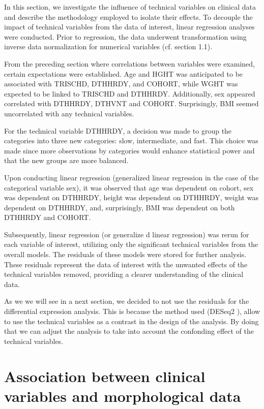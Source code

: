 \documentclass[a4paper, 11pt]{article}
\begin{document}
\begin{multicols}{2}
In this section, we investigate the influence of technical variables on clinical data and describe the methodology employed to isolate their effects.
To decouple the impact of technical variables from the data of interest, linear regression analyses were conducted.
Prior to regression, the data underwent transformation using inverse data normalization for numerical variables (cf. section 1.1).

From the preceding section where correlations between variables were examined, certain expectations were established.
Age and HGHT was anticipated to be associated with TRISCHD, DTHHRDY, and COHORT, while WGHT was expected to be linked to TRISCHD and DTHHRDY.
Additionally, sex appeared correlated with DTHHRDY, DTHVNT and COHORT. Surprisingly, BMI seemed uncorrelated with any technical variables.

For the technical variable DTHHRDY, a decision was made to group the categories into three new categories: slow, intermediate, and fast.
This choice was made since more observations by categories would enhance statistical power and that the new groups are more balanced.

Upon conducting linear regression (generalized linear regression in the case of the categorical variable sex), it was observed that age was dependent on cohort, sex was dependent on DTHHRDY, height was dependent on DTHHRDY, weight was dependent on DTHHRDY, and, surprisingly, BMI was dependent on both DTHHRDY and COHORT.

Subsequently, linear regression (or generalize d linear regression) was rerun for each variable of interest, utilizing only the significant technical variables from the overall models.
The residuals of these models were stored for further analysis.
These residuals represent the data of interest with the unwanted effects of the technical variables removed, providing a clearer understanding of the clinical data.

As we we will see in a next section, we decided to not use the residuals for the differential expression analysis. This is because the method used (DESeq2 \citep{DESeq2:2014}), allow to use the technical variables as a contrast in the design of the analysis. By doing that we can adjust the analysis to take into account the confonding effect of the technical variables.

\section{Association between clinical variables and morphological data}


\end{multicols}
\end{document}
